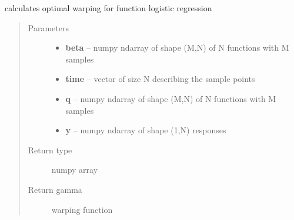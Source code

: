 \documentclass[letterpaper,10pt,english]{sphinxmanual}
\begin{document}

\begin{fulllineitems}
\label{regression:regression.logistic_warp}
calculates optimal warping for function logistic regression
\begin{quote}\begin{description}
\item[{Parameters}] \leavevmode\begin{itemize}
\item {} 
\textbf{beta} -- numpy ndarray of shape (M,N) of N functions with M samples

\item {} 
\textbf{time} -- vector of size N describing the sample points

\item {} 
\textbf{q} -- numpy ndarray of shape (M,N) of N functions with M samples

\item {} 
\textbf{y} -- numpy ndarray of shape (1,N) responses

\end{itemize}

\item[{Return type}] \leavevmode
numpy array

\item[{Return gamma}] \leavevmode
warping function

\end{description}\end{quote}

\end{fulllineitems}

\end{document}
